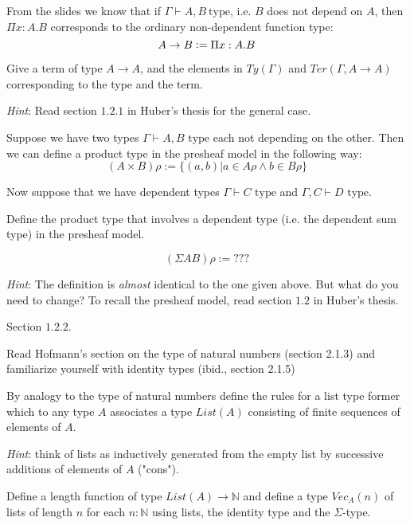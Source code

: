 \begin{exercise}
  From the slides we know that if $\Gamma \vdash A, B ~\text{type}$, i.e. $B$ does not depend on $A$,
  then $\Pi x: A. B$ corresponds to the ordinary non-dependent function type:
  \begin{equation*}
    A \to B \vcentcolon= \Pi x: A. B
  \end{equation*}

  Give a term of type $A \to A$, and the elements in $\mathit{Ty}(\Gamma)$ and $\mathit{Ter}(\Gamma, A \to A)$ corresponding to the type and the term.

  \emph{Hint}: Read section $1.2.1$ in Huber's thesis for the general case.

\end{exercise}

\begin{exercise}
  Suppose we have two types $\Gamma \vdash A,B \text{ type}$ each not depending on the other.
  Then we can define a product type in the presheaf model in the following way:
  \[
    (A \times B)\rho := \{(a,b) | a \in A\rho \land b \in B\rho\}
  \]

  Now suppose that we have dependent types $\Gamma \vdash C \text{ type}$ and
  $\Gamma, C \vdash D \text{ type}$.

  Define the product type that involves a
  dependent type (i.e. the dependent sum type) in the presheaf model.

  \[
    (\Sigma AB)\rho := ???
  \]

  \emph{Hint}: The definition is \emph{almost} identical to the one given
  above. But what do you need to change? To recall the presheaf model, read
  section $1.2$ in Huber's thesis.
\end{exercise}
\begin{answer}
  Section $1.2.2$.
\end{answer}

\begin{exercise}
  Read Hofmann's section on the type of natural numbers (section 2.1.3) and familiarize yourself with identity types (ibid., section 2.1.5)

  By analogy to the type of natural numbers define the rules for a list type
  former which to any type $A$ associates a type $\mathit{List}(A)$ consisting of finite
  sequences of elements of $A$.

  \emph{Hint}: think of lists as inductively
  generated from the empty list by successive additions of elements of $A$
  ("cons").

  Define a length function of type $\mathit{List}(A) \to \mathbb{N}$ and
  define a type $\mathit{Vec}_A(n)$ of lists of length $n$ for each $n : \mathbb{N}$
  using lists, the identity type and the $\Sigma$-type.
\end{exercise}


